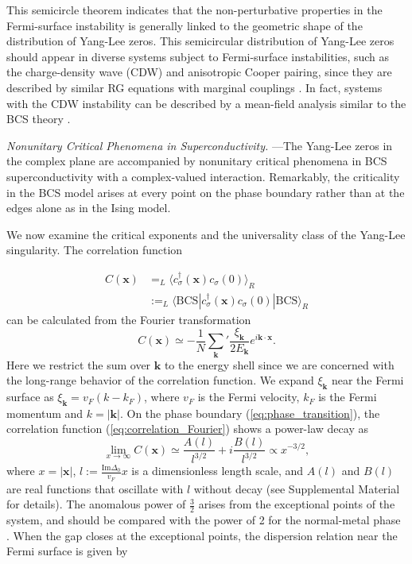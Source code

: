 \documentclass[aps,prl,twocolumn,superscriptaddress]{revtex4-1}
\begin{document}
This semicircle theorem indicates that the non-perturbative properties in the Fermi-surface instability is generally linked to the geometric shape of the distribution of Yang-Lee zeros. This semicircular distribution of Yang-Lee zeros should appear in diverse systems subject to Fermi-surface instabilities, such as the
charge-density wave (CDW) and anisotropic Cooper pairing,
since they are described by similar RG equations with
marginal couplings \cite{Shankar1994}. In fact, systems with the
CDW instability can be described by a mean-field analysis similar
to the BCS theory \cite{Gersch2005,PhysRevB.103.045142,PhysRevB.72.195106}. 

\emph{Nonunitary Critical Phenomena in Superconductivity.} ---The
Yang-Lee zeros in the complex plane are accompanied by
nonunitary critical phenomena in BCS superconductivity
with a complex-valued interaction.  
Remarkably, the criticality in the BCS model arises at every point on the phase boundary rather than at the edges alone as in the Ising model.

We now examine the critical exponents and the universality class of the Yang-Lee singularity. The correlation function

\begin{align}
C(\bm{x}) & =_{L}\langle c_{\sigma}^{\dagger}(\bm{x})c_{\sigma}(0)\rangle_{R}\nonumber \\
 & :=_{L}\langle\text{BCS}|c_{\sigma}^{\dagger}(\bm{x})c_{\sigma}(0)|\text{BCS}\rangle_{R}
\end{align}
can be calculated from the Fourier transformation
\begin{equation}
C(\bm{x})\simeq-\frac{1}{N}\sum_{\bm{k}}^ {}{'}\frac{\xi_{\bm{k}}}{2E_{\bm{k}}}e^{i\bm{k}\cdot\bm{x}}.\label{eq:correlation_Fourier}
\end{equation}
Here we restrict the sum over $\bm{k}$ to the energy shell since
we are concerned with the long-range behavior of the correlation function.
We expand $\xi_{\bm{k}}$ near the Fermi surface as $\xi_{{\bm{k}}}=v_{F}(k-k_{F})$,
where $v_{F}$ is the Fermi velocity, $k_{F}$ is the Fermi momentum
and $k=|\bm{k}|$. On the phase boundary (\ref{eq:phase_transition}),
the correlation function (\ref{eq:correlation_Fourier}) shows a
power-law decay as 
\begin{equation}
\lim_{x\rightarrow\infty}C(\bm{x})\simeq\frac{A(l)}{l^{3/2}}+i\frac{B(l)}{l^{3/2}}\propto x^{-3/2},\label{correlation}
\end{equation}
where $x=|\bm{x}|$, $l:=\frac{\text{Im}\Delta_0}{v_{F}}x$ is a
dimensionless length scale, and $A(l)$ and $B(l)$ are real functions
that oscillate with $l$ without decay (see Supplemental Material
\cite{SupplementaryMaterial} for details). The anomalous power of
$\frac{3}{2}$ arises from the exceptional points of the system, and should be compared with the power of 2 for the normal-metal
phase \cite{Sachdev:2011uj}. When the gap closes at the exceptional points, the
dispersion relation near the Fermi surface is given by
\end{document}
